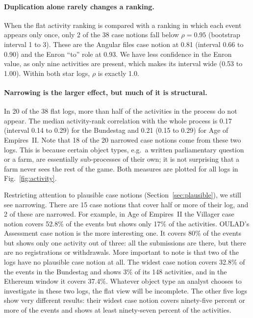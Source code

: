 \documentclass[pdflatex,sn-mathphys-num]{sn-jnl}
\begin{document}
\paragraph{Duplication alone rarely changes a ranking.} When the flat activity ranking is compared with a ranking in which each event appears only once, only 2 of the 38 case notions fall below $\rho = 0.95$ (bootstrap interval 1 to 3). These are the Angular files case notion at 0.81 (interval 0.66 to 0.90) and the Enron ``to'' role at 0.93. We have less confidence in the Enron value, as only nine activities are present, which makes its interval wide (0.53 to 1.00). Within both star logs, $\rho$ is exactly 1.0.

\paragraph{Narrowing is the larger effect, but much of it is structural.} In 20 of the 38 flat logs, more than half of the activities in the process do not appear. The median activity-rank correlation with the whole process is 0.17 (interval 0.14 to 0.29) for the Bundestag and 0.21 (0.15 to 0.29) for Age of Empires~II. Note that 18 of the 20 narrowed case notions come from these two logs. This is because certain object types, e.g.\ a written parliamentary question or a farm, are essentially sub-processes of their own; it is not surprising that a farm never sees the rest of the game. Both measures are plotted for all logs in Fig.~\ref{fig:activity}.

Restricting attention to plausible case notions (Section~\ref{sec:plausible}), we still see narrowing. There are 15 case notions that cover half or more of their log, and 2 of these are narrowed. For example, in Age of Empires~II the Villager case notion covers 52.8\% of the events but shows only 17\% of the activities. OULAD's Assessment case notion is the more interesting one. It covers 80\% of the events but shows only one activity out of three: all the submissions are there, but there are no registrations or withdrawals. More important to note is that two of the logs have no plausible case notion at all. The widest case notion covers 32.8\% of the events in the Bundestag and shows 3\% of its 148 activities, and in the Ethereum window it covers 37.4\%. Whatever object type an analyst chooses to investigate in these two logs, the flat view will be incomplete. The other five logs show very different results: their widest case notion covers ninety-five percent or more of the events and shows at least ninety-seven percent of the activities.
\end{document}
